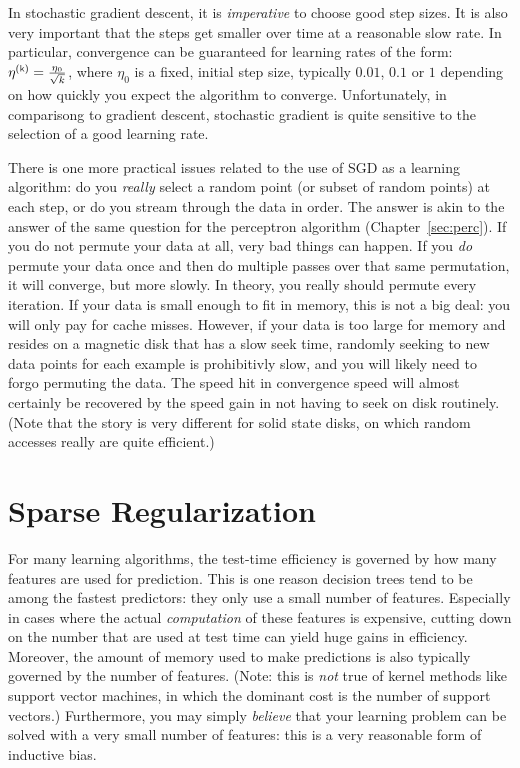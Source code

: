 In stochastic gradient descent, it is \emph{imperative} to choose good
step sizes.  It is also very important that the steps get smaller over
time at a reasonable slow rate.  In particular, convergence can be
guaranteed for learning rates of the form: $\eta\kth = \frac {\eta_0}
{\sqrt{k}}$, where $\eta_0$ is a fixed, initial step size, typically
$0.01$, $0.1$ or $1$ depending on how quickly you expect the algorithm
to converge.  Unfortunately, in comparisong to gradient descent,
stochastic gradient is quite sensitive to the selection of a good
learning rate.

There is one more practical issues related to the use of SGD as a
learning algorithm: do you \emph{really} select a random point (or
subset of random points) at each step, or do you stream through the
data in order.  The answer is akin to the answer of the same question
for the perceptron algorithm (Chapter~\ref{sec:perc}).  If you do not
permute your data at all, very bad things can happen.  If you
\emph{do} permute your data once and then do multiple passes over that
same permutation, it will converge, but more slowly.  In theory, you
really should permute every iteration.  If your data is small enough
to fit in memory, this is not a big deal: you will only pay for cache
misses.  However, if your data is too large for memory and resides on
a magnetic disk that has a slow seek time, randomly seeking to new
data points for each example is prohibitivly slow, and you will likely
need to forgo permuting the data.  The speed hit in convergence speed
will almost certainly be recovered by the speed gain in not having to
seek on disk routinely.  (Note that the story is very different for
solid state disks, on which random accesses really are quite
efficient.)


\section{Sparse Regularization}

For many learning algorithms, the test-time efficiency is governed by
how many features are used for prediction.  This is one reason
decision trees tend to be among the fastest predictors: they only use
a small number of features.  Especially in cases where the actual
\emph{computation} of these features is expensive, cutting down on the
number that are used at test time can yield huge gains in efficiency.
Moreover, the amount of memory used to make predictions is also
typically governed by the number of features.  (Note: this is
\emph{not} true of kernel methods like support vector machines, in
which the dominant cost is the number of support vectors.)
Furthermore, you may simply \emph{believe} that your learning problem
can be solved with a very small number of features: this is a very
reasonable form of inductive bias.

